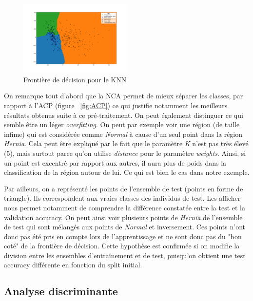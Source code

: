 \documentclass[twocolumn,10pt]{article}
\begin{document}
\begin{figure}[htbp]
    \begin{center}
        \includegraphics[width=0.5\textwidth]{figures/decision_boundary_knn.png}
        \caption{\label{fig:decision_boundary}Frontière de décision pour le KNN}
    \end{center}
\end{figure}

On remarque tout d'abord que la NCA permet de mieux séparer les classes, par rapport à l'ACP (figure ~\ref{fig:ACP}) ce qui justifie notamment les meilleurs résultats obtenus suite à ce pré-traitement. On peut également distinguer ce qui semble être un léger \textit{overfitting}. On peut par exemple voir une région (de taille infime) qui est considérée comme \textit{Normal} à cause d'un seul point dans la région \textit{Hernia}.
Cela peut être expliqué par le fait que le paramètre \textit{K} n'est pas très élevé (5), mais surtout parce qu'on utilise \textit{distance} pour le paramètre \textit{weights}. Ainsi, si un point est excentré par rapport aux autres, il aura plus de poids dans la classification de la région autour de lui. Ce qui est bien le cas dans notre exemple.

Par ailleurs, on a représenté les points de l'ensemble de test (points en forme de triangle). Ils correspondent aux vraies classes des individus de test. Les afficher nous permet notamment de comprendre la différence constatée entre la test et la validation accuracy.
On peut ainsi voir plusieurs points de \textit{Hernia} de l'ensemble de test qui sont mélangés aux points de \textit{Normal} et inversement. Ces points n'ont donc pas été pris en compte lors de l'apprentissage et ne sont donc pas du "bon coté" de la frontière de décision. Cette hypothèse est confirmée si on modifie la division entre les ensembles d'entraînement et de test, puisqu'on obtient une test accuracy différente en fonction du split initial.


\subsection{Analyse discriminante}
\end{document}
